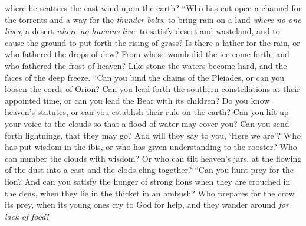 \begin{biblechapter}
where he scatters the east wind upon the earth?
\verse “Who has cut open a channel for the torrents 
and a way for the \textit{thunder bolts},
\verse to bring rain on a land \textit{where no one lives}, 
a desert \textit{where no humans live},
\verse to satisfy desert and wasteland, 
and to cause the ground to put forth the rising of grass?
\verse Is there a father for the rain, 
or who fathered the drops of dew?
\verse From whose womb did the ice come forth, 
and who fathered the frost of heaven?
\verse Like stone the waters become hard, 
and the faces of the deep freeze.
\verse “Can you bind the chains of the Pleiades, 
or can you loosen the cords of Orion?
\verse Can you lead forth the southern constellations at their appointed time, 
or can you lead the Bear with its children?
\verse Do you know heaven’s statutes, 
or can you establish their rule on the earth?
\verse Can you lift up your voice to the clouds 
so that a flood of water may cover you?
\verse Can you send forth lightnings, that they may go? 
And will they say to you, ‘Here we are’?
\verse Who has put wisdom in the ibis, 
or who has given understanding to the rooster?
\verse Who can number the clouds with wisdom? 
Or who can tilt heaven’s jars,
\verse at the flowing of the dust into a cast 
and the clods cling together?
\verse “Can you hunt prey for the lion? 
And can you satisfy the hunger of strong lions
\verse when they are crouched in the dens, 
when they lie in the thicket in an ambush?
\verse Who prepares for the crow its prey, 
when its young ones cry to God for help, 
and they wander around \textit{for lack of food}?
\end{biblechapter}

